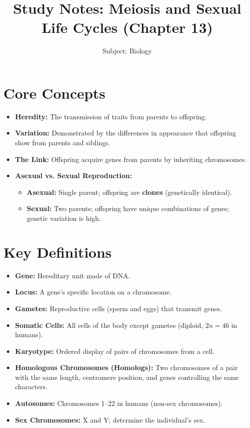 \documentclass[11pt, a4paper]{article}
\title{Study Notes: Meiosis and Sexual Life Cycles (Chapter 13)}
\author{Subject: Biology}
\date{}
\begin{document}
\maketitle

\section*{Core Concepts}
\begin{itemize}
    \item \textbf{Heredity:} The transmission of traits from parents to offspring.
    \item \textbf{Variation:} Demonstrated by the differences in appearance that offspring show from parents and siblings.
    \item \textbf{The Link:} Offspring acquire genes from parents by inheriting chromosomes.
    \item \textbf{Asexual vs. Sexual Reproduction:}
    \begin{itemize}
        \item \textbf{Asexual:} Single parent; offspring are \textbf{clones} (genetically identical).
        \item \textbf{Sexual:} Two parents; offspring have unique combinations of genes; genetic variation is high.
    \end{itemize}
\end{itemize}

\section*{Key Definitions}
\begin{itemize}
    \item \textbf{Gene:} Hereditary unit made of DNA.
    \item \textbf{Locus:} A gene's specific location on a chromosome.
    \item \textbf{Gametes:} Reproductive cells (sperm and eggs) that transmit genes.
    \item \textbf{Somatic Cells:} All cells of the body except gametes (diploid, $2n = 46$ in humans).
    \item \textbf{Karyotype:} Ordered display of pairs of chromosomes from a cell.
    \item \textbf{Homologous Chromosomes (Homologs):} Two chromosomes of a pair with the same length, centromere position, and genes controlling the same characters.
    \item \textbf{Autosomes:} Chromosomes 1--22 in humans (non-sex chromosomes).
    \item \textbf{Sex Chromosomes:} X and Y; determine the individual's sex.
\end{itemize}
\end{document}
